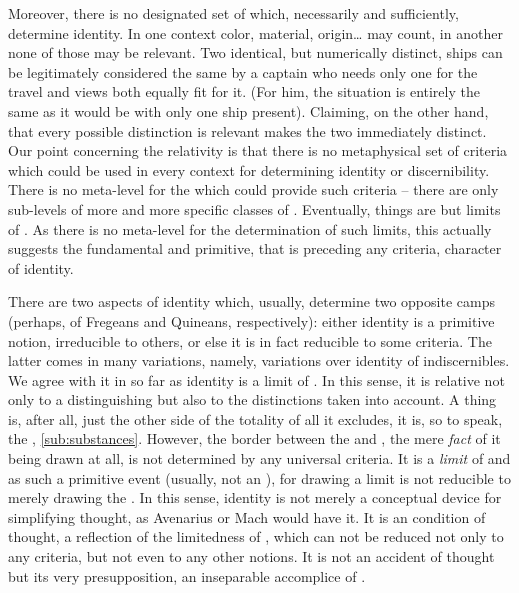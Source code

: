 Moreover, there is no designated set of  which, necessarily and
sufficiently, determine identity. In one context color, material, origin\ldots
may count, in another none of those may be relevant.  Two identical, but
numerically distinct, ships can be legitimately considered the same by a captain
who needs only one for the travel and views both equally fit for it.  (For him,
the situation is entirely the same as it would be with only one ship present).
Claiming, on the other hand, that every possible distinction is relevant makes
the two immediately distinct. Our point concerning the relativity is that there
is no metaphysical set of criteria which could be used in every context for
determining identity or discernibility.  There is no meta-level for the
 which could provide such criteria -- there are only sub-levels
of more and more specific classes of .  Eventually, 
things are but limits of . As there is no meta-level for the
determination of such limits, this actually suggests the fundamental and
primitive, that is preceding any criteria, character of identity. 

There are two aspects of identity which, usually, determine two opposite camps
(perhaps, of Fregeans and Quineans, respectively): either identity is a
primitive notion, irreducible to others, or else it is in fact reducible to some
criteria. The latter comes in many variations, namely, variations over identity
of indiscernibles. We agree with it in so far as identity is a limit of
. In this sense, it is relative not only to a distinguishing
 but also to the distinctions taken into account. A thing is,
after all, just the other side of the totality of all it excludes, it is, so to
speak, the , \ref{sub:substances}. However, the
border between the  and , the mere {\em fact} of it
being drawn at all, is not determined by any universal criteria. It is a {\em
  limit} of  and as such a primitive event (usually, not an
), for drawing a limit is not reducible to merely drawing the
. In this sense, identity is not merely a conceptual device for
simplifying thought, as Avenarius or Mach would have it. It is an 
condition of thought, a reflection of the limitedness of , which
can not be reduced not only to any  criteria, but not even to any
other notions. It is not an accident of  thought but its very
presupposition, an inseparable accomplice of .


